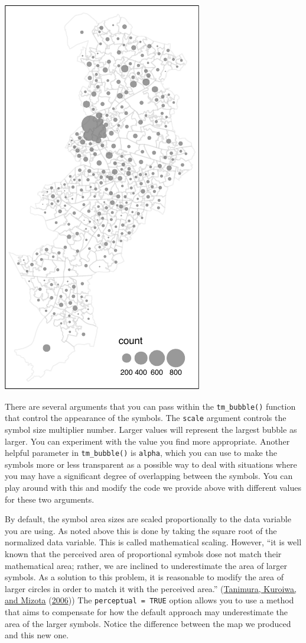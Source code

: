 \documentclass[
]{book}
\begin{document}
\includegraphics{crime_mapping_files/figure-latex/unnamed-chunk-79-1.pdf}

There are several arguments that you can pass within the \texttt{tm\_bubble()} function that control the appearance of the symbols. The \texttt{scale} argument controls the symbol size multiplier number. Larger values will represent the largest bubble as larger. You can experiment with the value you find more appropriate. Another helpful parameter in \texttt{tm\_bubble()} is \texttt{alpha}, which you can use to make the symbols more or less transparent as a possible way to deal with situations where you may have a significant degree of overlapping between the symbols. You can play around with this and modify the code we provide above with different values for these two arguments.

By default, the symbol area sizes are scaled proportionally to the data variable you are using. As noted above this is done by taking the square root of the normalized data variable. This is called mathematical scaling. However, ``it is well known that the perceived area of proportional symbols dose not match their mathematical area; rather, we are inclined to underestimate the area of larger symbols. As a solution to this problem, it is reasonable to modify the area of larger circles in order to match it with the perceived area.'' (\protect\hyperlink{ref-Tanimura_2006}{Tanimura, Kuroiwa, and Mizota} (\protect\hyperlink{ref-Tanimura_2006}{2006})) The \texttt{perceptual\ =\ TRUE} option allows you to use a method that aims to compensate for how the default approach may underestimate the area of the larger symbols. Notice the difference between the map we produced and this new one.
\end{document}

